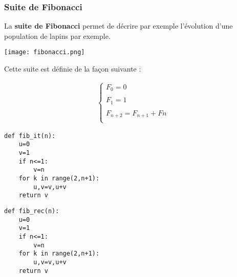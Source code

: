\subsubsection{Suite de Fibonacci}



La \textbf{suite de Fibonacci} permet de décrire par exemple l'évolution d'une population de lapins par exemple.

\begin{center}
\texttt{[image: fibonacci.png]}
\end{center}

Cette suite est définie de la façon suivante : 

\begin{align*}
\left\{
\begin{array}{c}
F_0=0\\
\\
F_1=1\\
\\
F_{n+2}=F_{n+1}+F{n}\\
\end{array}
\right.
\end{align*}








\begin{lstlisting}
def fib_it(n):
    u=0
    v=1
    if n<=1:
        v=n
    for k in range(2,n+1):
        u,v=v,u+v
    return v
\end{lstlisting}


\begin{lstlisting}
def fib_rec(n):
    u=0
    v=1
    if n<=1:
        v=n
    for k in range(2,n+1):
        u,v=v,u+v
    return v
\end{lstlisting}